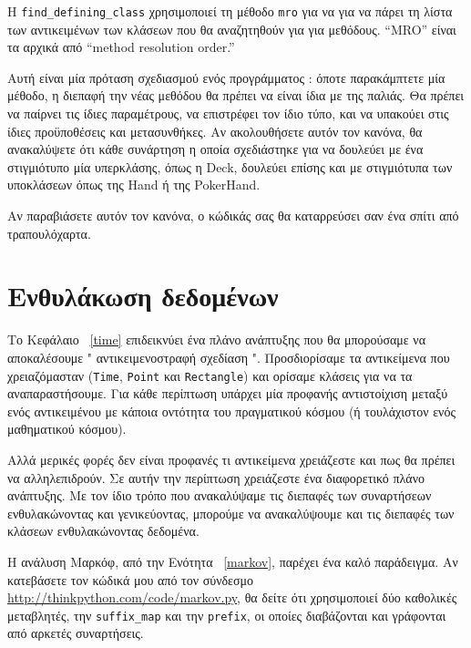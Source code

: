 \documentclass[10pt]{book}
\begin{document}
 Η  \verb"find_defining_class"  χρησιμοποιεί τη μέθοδο  {\tt mro}  για να 
για να πάρει τη λίστα των αντικειμένων των κλάσεων που θα αναζητηθούν για για μεθόδους.  
 ``MRO''  είναι τα αρχικά από  ``method resolution order.''

 Αυτή είναι μία πρόταση σχεδιασμού ενός προγράμματος :  όποτε παρακάμπτετε μία 
μέθοδο, η διεπαφή την νέας μεθόδου θα πρέπει να είναι ίδια με της παλιάς.  Θα πρέπει να 
παίρνει τις ίδιες παραμέτρους, να επιστρέφει τον ίδιο τύπο, και να υπακούει στις ίδιες 
προϋποθέσεις και μετασυνθήκες.  Αν ακολουθήσετε αυτόν τον κανόνα, θα ανακαλύψετε ότι κάθε 
συνάρτηση η οποία σχεδιάστηκε για να δουλεύει με ένα στιγμιότυπο μία υπερκλάσης, όπως η 
 Deck,  δουλεύει επίσης και με στιγμιότυπα των υποκλάσεων όπως της  Hand  ή της  PokerHand.

 Αν παραβιάσετε αυτόν τον κανόνα, ο κώδικάς σας θα καταρρεύσει σαν ένα σπίτι από 
τραπουλόχαρτα.



\section{Ενθυλάκωση δεδομένων}

Το Κεφάλαιο~ \ref{time}  επιδεικνύει ένα πλάνο ανάπτυξης που θα μπορούσαμε 
να αποκαλέσουμε  " αντικειμενοστραφή σχεδίαση ".   Προσδιορίσαμε τα αντικείμενα 
που χρειαζόμασταν  ({\tt Time}, {\tt Point}  και  {\tt Rectangle})  και ορίσαμε 
κλάσεις για να τα αναπαραστήσουμε.  Για κάθε περίπτωση υπάρχει μία προφανής αντιστοίχιση 
μεταξύ ενός αντικειμένου με κάποια οντότητα του πραγματικού κόσμου (ή τουλάχιστον ενός μαθηματικού κόσμου).

Αλλά μερικές φορές δεν είναι προφανές τι αντικείμενα χρειάζεστε και πως θα πρέπει να 
αλληλεπιδρούν.  Σε αυτήν την περίπτωση χρειάζεστε ένα διαφορετικό πλάνο ανάπτυξης.  Με 
τον ίδιο τρόπο που ανακαλύψαμε τις διεπαφές των συναρτήσεων ενθυλακώνοντας και 
γενικεύοντας, μπορούμε να ανακαλύψουμε και τις διεπαφές των κλάσεων ενθυλακώνοντας δεδομένα.

Η ανάλυση Μαρκόφ, από την Ενότητα~ \ref{markov},  παρέχει ένα καλό παράδειγμα.  
Αν κατεβάσετε τον κώδικά μου από τον σύνδεσμο  \url{http://thinkpython.com/code/markov.py},  θα δείτε ότι χρησιμοποιεί δύο καθολικές 
μεταβλητές, την  \verb"suffix_map"  και την  \verb"prefix",  οι οποίες διαβάζονται και γράφονται από αρκετές συναρτήσεις. 
\end{document}
